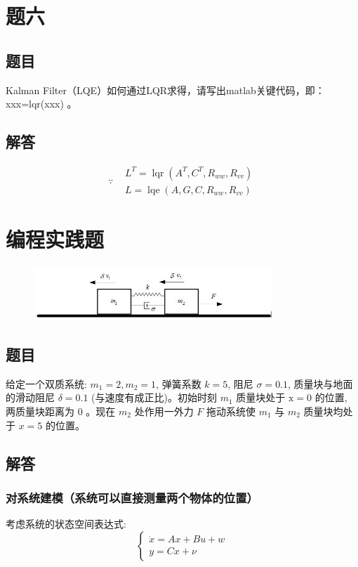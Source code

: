 \documentclass[UTF8]{ctexart}
\begin{document}
\section{题六}

  \subsection{题目}
  Kalman Filter（LQE）如何通过LQR求得，请写出matlab关键代码，即：xxx=lqr(xxx) 。
  \subsection{解答}
  $$
  \because
    \begin{aligned}
      &L^{T}=\operatorname{lqr}\left(A^{T}, C^{T}, R_{w w}, R_{v v}\right) \\
      &L=\operatorname{lqe}\left(A, G, C, R_{w w}, R_{v v}\right)
    \end{aligned}
  $$
  

\section{编程实践题}
\begin{figure}[h]
\centering
\includegraphics[width=0.8\textwidth]{figures/kf.jpg}
\end{figure}

  \subsection{题目}
  给定一个双质系统: $m_{1}=2, m_{2}=1$, 弹簧系数 $k=5$, 阻尼 $\sigma=0.1$, 质量块与地面的滑动阻尼 $\delta=0.1$ (与速度有成正比)。初始时刻 $m_{1}$ 质量块处于 $\mathrm{x}=0$ 的位置, 两质量块距离为 0 。现在 $m_{2}$ 处作用一外力 $F$ 拖动系统使 $m_{1}$ 与 $m_{2}$ 质量块均处于 $x=5$ 的位置。
  \subsection{解答}
  \subsubsection{对系统建模（系统可以直接测量两个物体的位置）}
  \par 考虑系统的状态空间表达式:
  $$
  \left\{\begin{array}{l}
    \dot{x}=A x+B u+w \\
    y=C x+\nu
    \end{array}\right.
  $$
  
\end{document}

